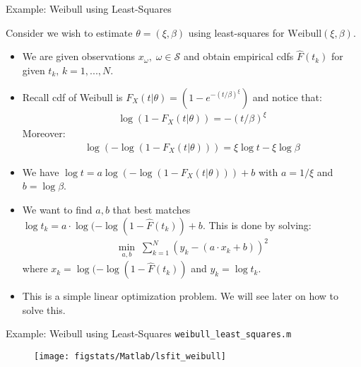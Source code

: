 \documentclass[9pt]{beamer}
\begin{document}
%
\begin{frame}{Example: Weibull using Least-Squares}

Consider we wish to estimate $\theta=(\xi,\beta)$ using least-squares for $\textrm{Weibull}(\xi,\beta)$. 
\begin{itemize}
\item We are given observations $x_\omega,\; \omega \in \mathcal{S}$ and obtain empirical cdfs $\hat{F}(t_k)$ for given $t_k,\, k=1,...,N$. 
\item Recall cdf of Weibull is $F_X(t|\theta)=(1-e^{-(t/\beta)^\xi})$ and notice that:
\begin{align*}
\log(1-F_X(t|\theta))=-(t/\beta)^\xi
\end{align*}
Moreover:
\begin{align*}
\log(-\log(1-F_X(t|\theta)))= \xi \log t-\xi \log \beta
\end{align*}
\item We have $\log t=a\log(-\log(1-F_X(t|\theta)))+b$ with $a=1/\xi$ and $b=\log\beta$. 
\item We want to find $a,b$ that best matches $\log t_k=a\cdot \log(-\log(1-\hat{F}(t_k))+b$. This is done by solving:
\begin{align*}
\min_{a,b}\; \sum_{k=1}^N\left (y_k-(a\cdot x_k+b)\right)^2
\end{align*}
where $x_k=\log(-\log(1-\hat{F}(t_k))$ and $y_k=\log t_k$. 
\item This is a simple linear optimization problem. We will see later on how to solve this. 
\end{itemize}


\end{frame}

%
\begin{frame}{Example: Weibull using Least-Squares \footnotesize{\texttt{weibull\_least\_squares.m}}}

\begin{figure}[!htb]
    \centering
	\texttt{[image: figstats/Matlab/lsfit\_weibull]}
\end{figure}

\end{frame}
\end{document}
